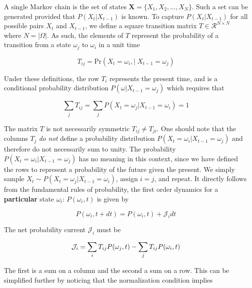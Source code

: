 \documentclass{ucetd}
\begin{document}
A single Markov chain is the set of states $\bm{X} = \{X_{1},X_{2},...,X_{N}\}$. Such a set can be generated provided that $P(X_{t}|X_{t-1})$ is known. To capture $P(X_{t}|X_{t-1})$ for all possible pairs $X_{t}$ and $X_{t-1}$, we define a square transition matrix $T\in \mathcal{R}^{N\times N}$ where $N = |\Omega|$. As such, the elements of $T$ represent the probability of a transition from a state $\omega_{j}$ to $\omega_{i}$ in a unit time

\begin{equation*}
T_{ij} = \mathrm{Pr}\left(X_{t}=\omega_{i}, | \;X_{t-1}=\omega_{j}\right)
\end{equation*}

Under these definitions, the row $T_{i}$ represents the present time, and is a conditional  probability distribution $P(\omega | X_{t-1} = \omega_{j})$ which requires that

\begin{equation*}
\sum_{j}T_{ij} = \sum_{j} P(X_{t} = \omega_{j} | X_{t-1} = \omega_{i}) = 1
\end{equation*}

The matrix $T$ is not necessarily symmetric $T_{ij} \neq T_{ji}$. One should note that the columns $T_{j}$ \emph{do not} define a probability distribution $P(X_{t} = \omega_{i} | X_{t-1} = \omega_{j})$ and therefore do not necessarily sum to unity. The probability $P(X_{t} = \omega_{i} | X_{t-1} = \omega_{j})$ has no meaning in this context, since we have defined the rows to represent a probability of the future given the present. We simply sample $X_{t} \sim P(X_{t} = \omega_{j} | X_{t-1} = \omega_{i})$, assign $i=j$, and repeat. It directly follows from the fundamental rules of probability, the first order dynamics for a \textbf{particular} state $\omega_{i}$: $P(\omega_{i},t)$ is given by

\begin{equation}
P(\omega_{i},t+dt) = P(\omega_{i},t) + \mathcal{J}_{i}dt
\end{equation}

The net probability current $\mathcal{J}_{i}$ must be 

\begin{equation*}
\mathcal{J}_{i} = \sum_{i}T_{ij}P(\omega_{j},t) - \sum_{j}T_{ij}P(\omega_{i},t)\\
\end{equation*}

The first is a sum on a column and the second a sum on a row. This can be simplified further by noticing that the normalization condition implies
\end{document}
